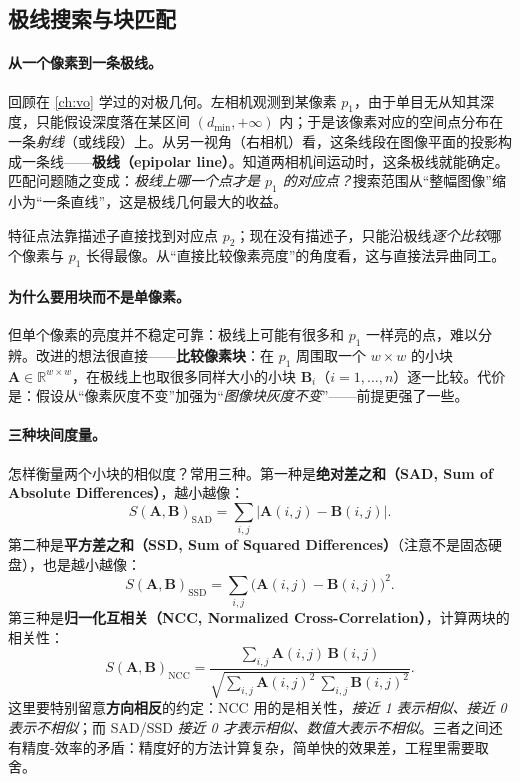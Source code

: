 \subsection{极线搜索与块匹配}
\label{sec:dense-epipolar}

\paragraph{从一个像素到一条极线。}
回顾在 \cref{ch:vo} 学过的对极几何。左相机观测到某像素 $p_1$，由于单目无从知其深度，只能假设深度落在某区间 $(d_{\min},+\infty)$ 内；于是该像素对应的空间点分布在一条\emph{射线}（或线段）上。从另一视角（右相机）看，这条线段在图像平面的投影构成一条线——\textbf{极线（epipolar line）}。知道两相机间运动时，这条极线就能确定。匹配问题随之变成：\emph{极线上哪一个点才是 $p_1$ 的对应点？}搜索范围从“整幅图像”缩小为“一条直线”，这是极线几何最大的收益。

特征点法靠描述子直接找到对应点 $p_2$；现在没有描述子，只能沿极线\emph{逐个比较}哪个像素与 $p_1$ 长得最像。从“直接比较像素亮度”的角度看，这与直接法异曲同工。

\paragraph{为什么要用块而不是单像素。}
但单个像素的亮度并不稳定可靠：极线上可能有很多和 $p_1$ 一样亮的点，难以分辨。改进的想法很直接——\textbf{比较像素块}：在 $p_1$ 周围取一个 $w\times w$ 的小块 $\mathbf{A}\in\mathbb{R}^{w\times w}$，在极线上也取很多同样大小的小块 $\mathbf{B}_i$（$i=1,\dots,n$）逐一比较。代价是：假设从“像素灰度不变”加强为“\emph{图像块灰度不变}”——前提更强了一些。

\paragraph{三种块间度量。}
怎样衡量两个小块的相似度？常用三种\cite{gaoxiang2019slam14}。第一种是\textbf{绝对差之和（SAD, Sum of Absolute Differences）}，越小越像：
\begin{equation}
  S(\mathbf{A},\mathbf{B})_{\mathrm{SAD}}=\sum_{i,j}\bigl|\mathbf{A}(i,j)-\mathbf{B}(i,j)\bigr|.
  \label{eq:dense-sad}
\end{equation}
第二种是\textbf{平方差之和（SSD, Sum of Squared Differences）}（注意不是固态硬盘），也是越小越像：
\begin{equation}
  S(\mathbf{A},\mathbf{B})_{\mathrm{SSD}}=\sum_{i,j}\bigl(\mathbf{A}(i,j)-\mathbf{B}(i,j)\bigr)^2.
  \label{eq:dense-ssd}
\end{equation}
第三种是\textbf{归一化互相关（NCC, Normalized Cross-Correlation）}，计算两块的相关性：
\begin{equation}
  S(\mathbf{A},\mathbf{B})_{\mathrm{NCC}}=\frac{\displaystyle\sum_{i,j}\mathbf{A}(i,j)\,\mathbf{B}(i,j)}{\sqrt{\displaystyle\sum_{i,j}\mathbf{A}(i,j)^2\ \sum_{i,j}\mathbf{B}(i,j)^2}}.
  \label{eq:dense-ncc}
\end{equation}
这里要特别留意\textbf{方向相反}的约定：NCC 用的是相关性，\emph{接近 1 表示相似、接近 0 表示不相似}；而 SAD/SSD \emph{接近 0 才表示相似、数值大表示不相似}。三者之间还有精度-效率的矛盾：精度好的方法计算复杂，简单快的效果差，工程里需要取舍。

